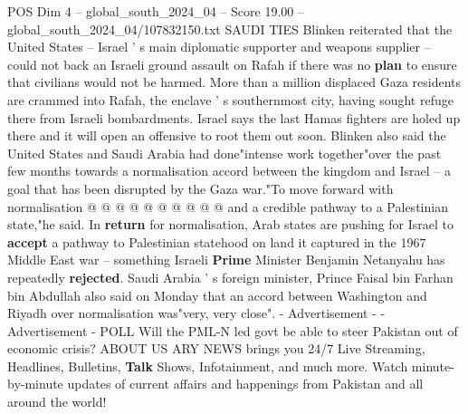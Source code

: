 \begin{textsample}{POS Dim 4 – global\_south\_2024\_04 – Score 19.00 – global\_south\_2024\_04/107832150.txt}
SAUDI TIES Blinken reiterated that the United States -- Israel ' s main diplomatic supporter and weapons supplier -- could not back an Israeli ground assault on Rafah if there was no \textbf{plan} to ensure that civilians would not be harmed.
More than a million displaced Gaza residents are crammed into Rafah, the enclave ' s southernmost city, having sought refuge there from Israeli bombardments.
Israel says the last Hamas fighters are holed up there and it will open an offensive to root them out soon.
Blinken also said the United States and Saudi Arabia had done"intense work together"over the past few months towards a normalisation accord between the kingdom and Israel -- a goal that has been disrupted by the Gaza war."To move forward with normalisation @ @ @ @ @ @ @ @ @ @ and a credible pathway to a Palestinian state,"he said.
In \textbf{return} for normalisation, Arab states are pushing for Israel to \textbf{accept} a pathway to Palestinian statehood on land it captured in the 1967 Middle East war -- something Israeli \textbf{Prime} Minister Benjamin Netanyahu has repeatedly \textbf{rejected}.
Saudi Arabia ' s foreign minister, Prince Faisal bin Farhan bin Abdullah also said on Monday that an accord between Washington and Riyadh over normalisation was"very, very close". - Advertisement - - Advertisement - POLL Will the PML-N led govt be able to steer Pakistan out of economic crisis?
ABOUT US ARY NEWS brings you 24/7 Live Streaming, Headlines, Bulletins, \textbf{Talk} Shows, Infotainment, and much more.
Watch minute-by-minute updates of current affairs and happenings from Pakistan and all around the world!

\end{textsample}
